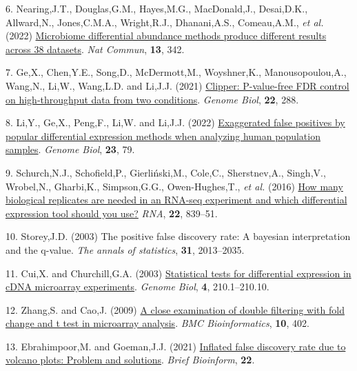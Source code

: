 \documentclass[
]{article}
\newlength{\cslhangindent}
\newenvironment{CSLReferences}[2] %
 {\begin{list}{}{%
  \setlength{\itemindent}{0pt}
  \setlength{\leftmargin}{0pt}
  \setlength{\parsep}{0pt}
  \ifodd #1
   \setlength{\leftmargin}{\cslhangindent}
   \setlength{\itemindent}{-1\cslhangindent}
  \fi
  \setlength{\itemsep}{#2\baselineskip}}}
 {\end{list}}
\begin{document}
\begin{CSLReferences}{1}{1}
6. Nearing,J.T., Douglas,G.M., Hayes,M.G., MacDonald,J., Desai,D.K.,
Allward,N., Jones,C.M.A., Wright,R.J., Dhanani,A.S., Comeau,A.M.,
\emph{et al.} (2022)
\href{https://doi.org/10.1038/s41467-022-28034-z}{Microbiome
differential abundance methods produce different results across 38
datasets}. \emph{Nat Commun}, \textbf{13}, 342.

7. Ge,X., Chen,Y.E., Song,D., McDermott,M., Woyshner,K.,
Manousopoulou,A., Wang,N., Li,W., Wang,L.D. and Li,J.J. (2021)
\href{https://doi.org/10.1186/s13059-021-02506-9}{Clipper: P-value-free
FDR control on high-throughput data from two conditions}. \emph{Genome
Biol}, \textbf{22}, 288.

8. Li,Y., Ge,X., Peng,F., Li,W. and Li,J.J. (2022)
\href{https://doi.org/10.1186/s13059-022-02648-4}{Exaggerated false
positives by popular differential expression methods when analyzing
human population samples}. \emph{Genome Biol}, \textbf{23}, 79.

9. Schurch,N.J., Schofield,P., Gierliński,M., Cole,C., Sherstnev,A.,
Singh,V., Wrobel,N., Gharbi,K., Simpson,G.G., Owen-Hughes,T., \emph{et
al.} (2016) \href{https://doi.org/10.1261/rna.053959.115}{How many
biological replicates are needed in an RNA-seq experiment and which
differential expression tool should you use?} \emph{RNA}, \textbf{22},
839--51.

10. Storey,J.D. (2003) The positive false discovery rate: A bayesian
interpretation and the q-value. \emph{The annals of statistics},
\textbf{31}, 2013--2035.

11. Cui,X. and Churchill,G.A. (2003)
\href{https://www.ncbi.nlm.nih.gov/pubmed/12702200}{Statistical tests
for differential expression in cDNA microarray experiments}.
\emph{Genome Biol}, \textbf{4}, 210.1--210.10.

12. Zhang,S. and Cao,J. (2009)
\href{https://doi.org/10.1186/1471-2105-10-402}{A close examination of
double filtering with fold change and t test in microarray analysis}.
\emph{BMC Bioinformatics}, \textbf{10}, 402.

13. Ebrahimpoor,M. and Goeman,J.J. (2021)
\href{https://doi.org/10.1093/bib/bbab053}{Inflated false discovery rate
due to volcano plots: Problem and solutions}. \emph{Brief Bioinform},
\textbf{22}.


\end{CSLReferences}
\end{document}
